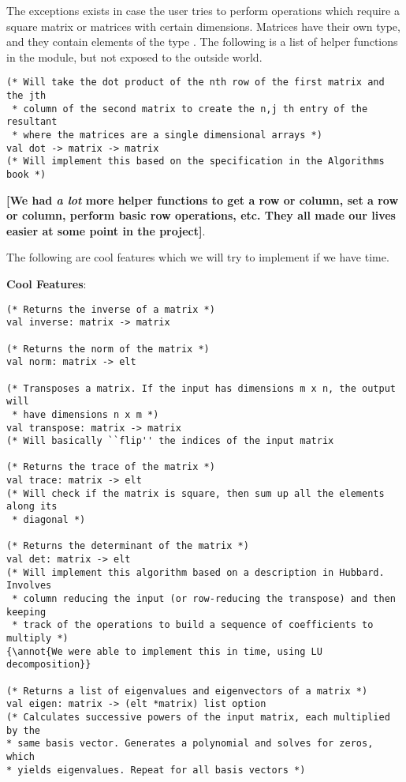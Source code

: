 \documentclass[letterpaper,11pt]{article}
\newcommand{\annot}[1]{\textbf{\color{BrickRed} [#1]}}
\begin{document}
The exceptions exists in case the user tries to perform operations which require
a square matrix or matrices with certain dimensions. Matrices have their own
type, and they contain elements of the type \verb@elt@. The following is a list
of helper functions in the module, but not exposed to the outside world.

\begin{verbatim}
(* Will take the dot product of the nth row of the first matrix and the jth
 * column of the second matrix to create the n,j th entry of the resultant 
 * where the matrices are a single dimensional arrays *)
val dot -> matrix -> matrix
(* Will implement this based on the specification in the Algorithms book *)
\end{verbatim}

{\annot{We had \emph{a lot} more helper functions to get a row or column, set a
row or column, perform basic row operations, etc. They all made our lives easier
at some point in the project}}.

The following are cool features which we will try to implement if we have time. 

\textbf{Cool Features}:

\begin{verbatim}
(* Returns the inverse of a matrix *)
val inverse: matrix -> matrix

(* Returns the norm of the matrix *)
val norm: matrix -> elt

(* Transposes a matrix. If the input has dimensions m x n, the output will
 * have dimensions n x m *)
val transpose: matrix -> matrix
(* Will basically ``flip'' the indices of the input matrix

(* Returns the trace of the matrix *)
val trace: matrix -> elt
(* Will check if the matrix is square, then sum up all the elements along its
 * diagonal *)

(* Returns the determinant of the matrix *)
val det: matrix -> elt
(* Will implement this algorithm based on a description in Hubbard. Involves
 * column reducing the input (or row-reducing the transpose) and then keeping
 * track of the operations to build a sequence of coefficients to multiply *)
{\annot{We were able to implement this in time, using LU decomposition}}

(* Returns a list of eigenvalues and eigenvectors of a matrix *)
val eigen: matrix -> (elt *matrix) list option
(* Calculates successive powers of the input matrix, each multiplied by the
* same basis vector. Generates a polynomial and solves for zeros, which
* yields eigenvalues. Repeat for all basis vectors *) 
\end{verbatim}
\end{document}
